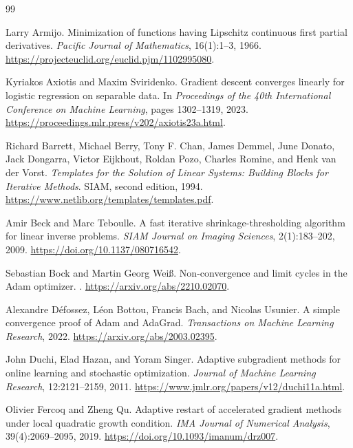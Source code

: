 \documentclass[11pt,twoside]{article}
\theoremstyle{definition}
\theoremstyle{remark}
\begin{document}
\clearpage
\begin{thebibliography}{99}

Larry Armijo.
\newblock Minimization of functions having Lipschitz continuous first partial
derivatives.
\newblock \emph{Pacific Journal of Mathematics}, 16(1):1--3, 1966.
\newblock \url{https://projecteuclid.org/euclid.pjm/1102995080}.

Kyriakos Axiotis and Maxim Sviridenko.
\newblock Gradient descent converges linearly for logistic regression on
separable data.
\newblock In \emph{Proceedings of the 40th International Conference on
Machine Learning}, pages 1302--1319, 2023.
\newblock \url{https://proceedings.mlr.press/v202/axiotis23a.html}.

Richard Barrett, Michael Berry, Tony F. Chan, James Demmel, June Donato,
Jack Dongarra, Victor Eijkhout, Roldan Pozo, Charles Romine, and Henk van der
Vorst.
\newblock \emph{Templates for the Solution of Linear Systems: Building Blocks
for Iterative Methods}.
\newblock SIAM, second edition, 1994.
\newblock \url{https://www.netlib.org/templates/templates.pdf}.

Amir Beck and Marc Teboulle.
\newblock A fast iterative shrinkage-thresholding algorithm for linear inverse
problems.
\newblock \emph{SIAM Journal on Imaging Sciences}, 2(1):183--202, 2009.
\newblock \url{https://doi.org/10.1137/080716542}.

Sebastian Bock and Martin Georg Wei\ss.
\newblock Non-convergence and limit cycles in the Adam optimizer.
.
\newblock \url{https://arxiv.org/abs/2210.02070}.

Alexandre D\'efossez, L\'eon Bottou, Francis Bach, and Nicolas Usunier.
\newblock A simple convergence proof of Adam and AdaGrad.
\newblock \emph{Transactions on Machine Learning Research}, 2022.
\newblock \url{https://arxiv.org/abs/2003.02395}.

John Duchi, Elad Hazan, and Yoram Singer.
\newblock Adaptive subgradient methods for online learning and stochastic
optimization.
\newblock \emph{Journal of Machine Learning Research}, 12:2121--2159, 2011.
\newblock \url{https://www.jmlr.org/papers/v12/duchi11a.html}.

Olivier Fercoq and Zheng Qu.
\newblock Adaptive restart of accelerated gradient methods under local
quadratic growth condition.
\newblock \emph{IMA Journal of Numerical Analysis}, 39(4):2069--2095, 2019.
\newblock \url{https://doi.org/10.1093/imanum/drz007}.


\end{thebibliography}
\end{document}
